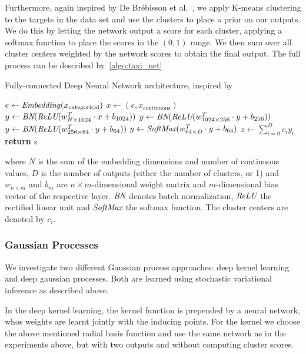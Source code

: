 Furthermore, again inspired by De Br{\'e}bisson et al.~\cite{de2015artificial},
we apply K-means clustering to the targets in the data set and use the clusters
to place a prior on our outputs. We do this by letting the network output a
score for each cluster, applying a softmax function to place the scores in the
$(0,1)$ range. We then sum over all cluster centers weighted by the network
scores to obtain the final output. The full process can be described
by~\autoref{algo:taxi_net}
\begin{algorithm}
    \caption{Fully-connected Deep Neural Network architecture, inspired
    by~\cite{de2015artificial}}
    \label{algo:taxi_net}
    \begin{algorithmic}[1]
        \State $e \gets \operatorname{\text{\textit{Embedding}}} (x_{\text{categorical}})$
        \State $x \gets (e, x_{\text{continuous}})$
        \State $y \gets \operatorname{\textit{BN}} (\operatorname{\textit{ReLU}} (w_{N \times 1024}^T \cdot x + b_{1024}))$
        \State $y \gets \operatorname{\textit{BN}} (\operatorname{\textit{ReLU}} (w_{1024 \times 256}^T \cdot y + b_{256}))$
        \State $y \gets \operatorname{\textit{BN}} (\operatorname{\textit{ReLU}} (w_{256 \times 64}^T \cdot y + b_{64}))$
        \State $y \gets \operatorname{\textit{SoftMax}} ( w_{64 \times D}^T \cdot y + b_{64})$
        \State $z \gets \sum_{i=0}^D c_i y_i$
        \State \textbf{return} z
        \EndFunction
    \end{algorithmic}
\end{algorithm}
where $N$ is the sum of the embedding dimensions and number of continuous
values, $D$ is the number of outputs (either the number of clusters, or 1) and
$w_{n \times m}$ and $b_{m}$ are $n\times m$-dimensional weight matrix and
$m$-dimensional bias vector of the respective layer. $\operatorname{\textit{BN}}$ denotes batch
normalization, $\operatorname{\textit{ReLU}}$ the rectified linear unit and $\operatorname{\textit{SoftMax}}$ the softmax
function. The cluster centers are denoted by $c_i$.


\subsubsection{Gaussian Processes}%
\label{ssub:gaussian_processes}

We investigate two different Gaussian process approaches: deep kernel learning
and deep gaussian processes. Both are learned using stochastic variational
inference as described above.

In the deep kernel learning, the kernel function is prepended by a neural
network, whos weights are learnt jointly with the inducing
points\cite{wilson2016stochastic}. For the kernel we choose the above mentioned
radial basis function and use the same network as in the experiments above, but
with two outputs and without computing cluster scores.

